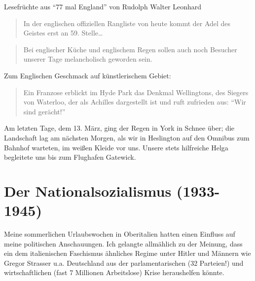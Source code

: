 \documentclass[a5paper,pagesize,10pt,twoside=true]{scrbook}
\renewcommand{\marginpar}[2][]{}
\begin{document}
Lesefrüchte aus \enquote{77 mal England} von Rudolph Walter Leonhard
\begin{quote}
	In der englischen offiziellen Rangliste von heute kommt der Adel des Geistes erst an 59. Stelle\dots
\end{quote}

\begin{quote}
	Bei englischer Küche und englischem Regen sollen auch noch Besucher unserer Tage melancholisch geworden sein.
\end{quote}

Zum Englischen Geschmack auf künstlerischem Gebiet:
\begin{quote}
	Ein Franzose erblickt im Hyde Park das Denkmal Wellingtons, des Siegers von Waterloo, der als Achilles dargestellt ist und ruft zufrieden aus: \enquote{Wir sind gerächt!}
\end{quote}

Am letzten Tage, dem 13. März, ging der Regen in York in Schnee über; die Landschaft lag am nächsten Morgen, als wir in Heslington auf den Omnibus zum Bahnhof warteten, im weißen Kleide vor uns. Unsere stets hilfreiche Helga begleitete uns bis zum Flughafen Gatewick.

\marginpar{Meine Lebenserinnerungen im Abriss von 1930 --}
\chapter{Der Nationalsozialismus (1933-1945)}
Meine sommerlichen Urlaubswochen in Oberitalien hatten einen Einfluss auf meine politischen Anschauungen. Ich gelangte allmählich zu der Meinung, dass ein dem italienischen Faschismus ähnliches Regime unter Hitler und Männern wie Gregor Strasser u.a. Deutschland aus der parlamentarischen (32 Parteien!) und wirtschaftlichen (fast 7 Millionen Arbeitslose) Krise heraushelfen könnte.
\end{document}
